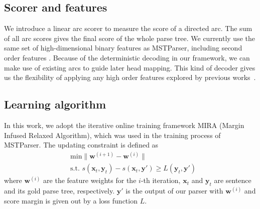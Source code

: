 \subsection{Scorer and features}
We introduce a linear arc scorer to measure the score of a directed arc.
The sum of all arc scores gives the final score of the whole parse tree.
We currently use the same set of high-dimensional binary features as MSTParser,
including second order features \cite{mcdonald2006online}.
Because of the deterministic decoding in our framework,
we can make use of existing arcs to guide later head mapping.
This kind of decoder gives us the flexibility of applying any
high order features explored by previous
works~\cite{carreras2007experiments,koo2010efficient,ma2012fourth}.

\subsection{Learning algorithm}
In this work, we adopt the iterative online training framework MIRA
(Margin Infused Relaxed Algorithm), which was used in the training process
of MSTParser. The updating constraint is defined as
\begin{align*}
&\text{min}\|\mathbf{w}^{(i+1)}-\mathbf{w}^{(i)}\|\\
&\text{s.t. } s(\boldsymbol{x}_t,\boldsymbol{y}_t)-s(\boldsymbol{x}_t,\boldsymbol{y}')\ge L(\boldsymbol{y}_t,\boldsymbol{y}')
\end{align*}
where $\mathbf{w}^{(i)}$ are the feature weights for the $i$-th iteration,
$\mathbf{x}_t$ and $\mathbf{y}_t$ are sentence and its gold parse tree,
respectively. $\mathbf{y}'$ is the output of our parser with $\mathbf{w}^{(i)}$ and
score margin is given out by a loss function $L$.

